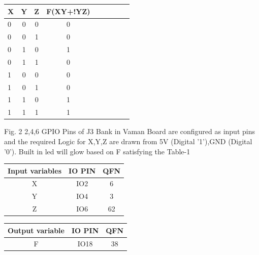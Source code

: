 \documentclass[10pt, a4paper]{article}
\begin{document}
\begin{center}
    \begin{tabular}{|l|c|c|c|c|c|c|c|c|} \hline 
  \textbf{X}& \textbf{Y} & \textbf{Z} &\textbf{F(XY+!YZ)} \\
 \hline
 0&0&0&0\\ \hline
0&0&1&0 \\ \hline
0&1&0&1\\ \hline
0&1&1&0  \\ \hline
1&0&0&0\\ \hline
1&0&1&0\\ \hline
1&1&0&1\\ \hline
1&1&1&1\\ \hline
\end{tabular}   
\end{center}
Fig. 2
2,4,6 GPIO Pins of J3 Bank in Vaman Board are configured as input pins and the required Logic for X,Y,Z are drawn from 5V (Digital '1'),GND (Digital '0'). Built in led will glow based on F satisfying the Table-1\\
\begin{center}
\begin{tabular}{|c|c|c|}
\hline
\textbf{Input variables}&\textbf{IO PIN}&\textbf{QFN}\\
\hline
X & IO2&6\\  
\hline
Y & IO4 &3\\ 
\hline
Z & IO6 &62\\
\hline
\end{tabular}

\begin{tabular}{|c|c|c|}
\hline
\textbf{Output variable}&\textbf{IO PIN}&\textbf{QFN}\\
\hline
F & IO18 &38\\  
\hline
\end{tabular}
\end{center}
\begin{center}
\end{center}
\end{document}
